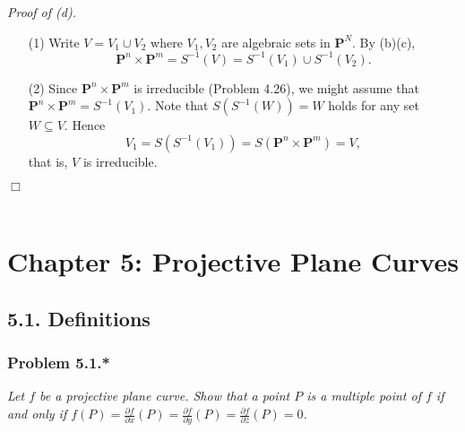 \documentclass{article}
\begin{document}
\emph{Proof of (d).}
\begin{enumerate}
\item[(1)]
  Write $V = V_1 \cup V_2$ where $V_1, V_2$ are algebraic sets in $\mathbf{P}^{N}$.
  By (b)(c),
  \[
    \mathbf{P}^{n} \times \mathbf{P}^{m}
    = S^{-1}(V)
    = S^{-1}(V_1) \cup S^{-1}(V_2).
  \]

\item[(2)]
  Since $\mathbf{P}^{n} \times \mathbf{P}^{m}$ is irreducible (Problem 4.26),
  we might assume that $\mathbf{P}^{n} \times \mathbf{P}^{m} = S^{-1}(V_1)$.
  Note that $S(S^{-1}(W)) = W$ holds for any set $W \subseteq V$.
  Hence
  \[
    V_1 = S(S^{-1}(V_1)) = S(\mathbf{P}^{n} \times \mathbf{P}^{m}) = V,
  \]
  that is, $V$ is irreducible.
\end{enumerate}
$\Box$ \\\\






\newpage
\section*{Chapter 5: Projective Plane Curves \\}



\subsection*{5.1. Definitions \\}



\subsubsection*{Problem 5.1.*}
\emph{Let $f$ be a projective plane curve.
Show that a point $P$ is a multiple point of $f$ if and only if
$f(P)
= \frac{\partial f}{\partial x}(P)
= \frac{\partial f}{\partial y}(P)
= \frac{\partial f}{\partial z}(P) = 0$.} \\
\end{document}
